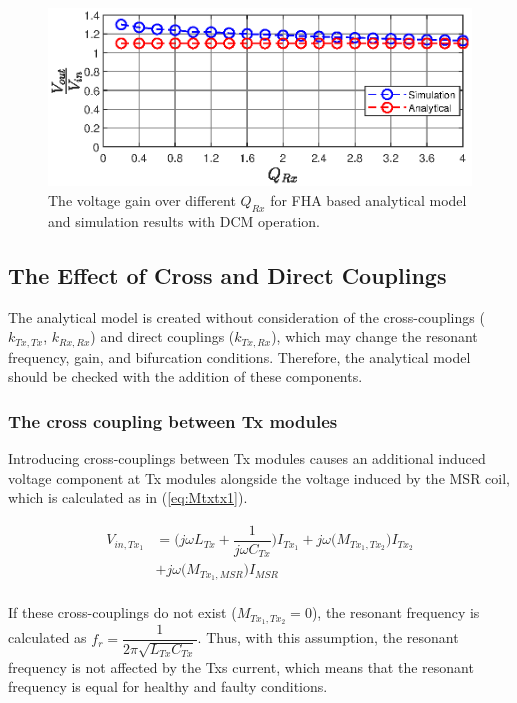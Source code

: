 \documentclass[journal]{IEEEtran}
\begin{document}
\begin{figure}[h]
    \centering
    \includegraphics[width=0.9\linewidth]{gain_Qrx.eps}
    \caption{The voltage gain over different $Q_{Rx}$ for FHA based analytical model and simulation results with DCM operation.}
    \label{fig:gain_Qrx}
\end{figure}
\subsection{The Effect of Cross and Direct Couplings}
The analytical model is created without consideration of the cross-couplings ( $k_{Tx,Tx}$, $k_{Rx,Rx}$) and direct couplings ($k_{Tx,Rx}$), which may change the resonant frequency, gain, and bifurcation conditions. Therefore, the analytical model should be checked with the addition of these components.

\subsubsection{The cross coupling between Tx modules}
Introducing cross-couplings between Tx modules causes an additional induced voltage component at Tx modules alongside the voltage induced by the MSR coil, which is calculated as in (\ref{eq:Mtxtx1}).

\begin{equation}
\begin{split}
    V_{in,Tx_{1}}&= \big(j\omega L_{Tx}+ \dfrac{1}{j\omega C_{Tx}}\big)I_{Tx_{1}} 
    + j\omega \big(M_{Tx_{1},Tx_{2}}\big) I_{Tx_{2}}    \\
               & + j\omega \big(M_{Tx_{1},MSR}\big)I_{MSR}    \\
\end{split} 
\label{eq:Mtxtx1}
\end{equation}



If these cross-couplings do not exist ($M_{Tx_{1},Tx_{2}}=0$), the resonant frequency is calculated as $f_r= \dfrac{1}{2\pi\sqrt{L_{Tx}C_{Tx}}}$.
Thus, with this assumption, the resonant frequency is not affected by the Txs current, which means that the resonant frequency is equal for healthy and faulty conditions. 
\end{document}
